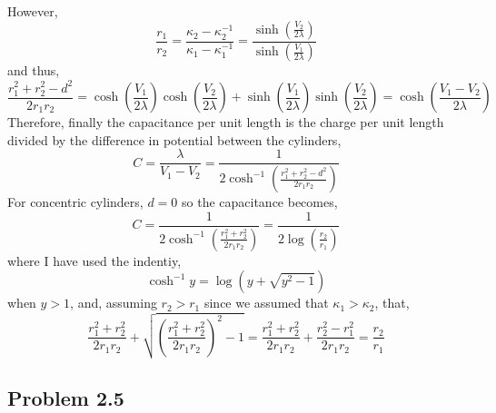 \documentclass[12pt]{extarticle}
\theoremstyle{definition}
\begin{document}
However,
\[ \frac{r_1}{r_2} = \frac{\kappa_2 - \kappa_2^{-1}}{\kappa_1 - \kappa_1^{-1}} = \frac{\sinh{\left( \frac{V_2}{2 \lambda} \right)}}{\sinh{\left( \frac{V_1}{2 \lambda} \right)}} \]
and thus,
\[ \frac{r_1^2 + r_2^2 - d^2}{2 r_1 r_2} =  \cosh{\left( \frac{V_1}{2 \lambda} \right)} \cosh{\left( \frac{V_2}{2 \lambda} \right)} + \sinh{\left( \frac{V_1}{2 \lambda} \right)} \sinh{\left( \frac{V_2}{2 \lambda} \right)} = \cosh{ \left( \frac{V_1 - V_2}{2 \lambda} \right) }\]
Therefore, finally the capacitance per unit length is the charge per unit length divided by the difference in potential between the cylinders,
\[ C = \frac{\lambda}{V_1 - V_2} = \frac{1}{2 \cosh^{-1}{\left( \frac{r_1^2 + r_2^2 - d^2}{2 r_1 r_2} \right)}}\]
For concentric cylinders, $d = 0$ so the capacitance becomes,
\[ C = \frac{1}{2 \cosh^{-1} \left( \frac{r_1^2 + r_2^2}{2 r_1 r_2} \right) } = \frac{1}{2 \log{\left( \frac{r_2}{r_1} \right) }} \]
where I have used the indentiy,
\[ \cosh^{-1}{y} = \log{\left( y + \sqrt{y^2 - 1} \right)} \]
when $y > 1$, and, assuming $r_2 > r_1$ since we assumed that $\kappa_1 > \kappa_2$, that,
\[ \frac{r_1^2 + r_2^2}{2 r_1 r_2} + \sqrt{ \left( \frac{r_1^2 + r_2^2}{2 r_1 r_2} \right)^2 - 1 } = \frac{r_1^2 + r_2^2}{2 r_1 r_2} + \frac{r_2^2 - r_1^2}{2 r_1 r_2} = \frac{r_2}{r_1} \]


\subsection{Problem 2.5}
\end{document}
